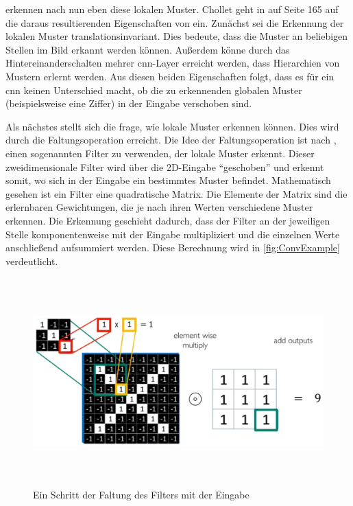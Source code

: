  erkennen nach \cite[S. 164]{DeepLearningPythonKeras} nun eben diese lokalen Muster.
Chollet geht in \cite{DeepLearningPythonKeras} auf Seite 165 auf die daraus resultierenden Eigenschaften von  ein.
Zunächst sei die Erkennung der lokalen Muster translationsinvariant.
Dies bedeute, dass die Muster an beliebigen Stellen im Bild erkannt werden können.
Außerdem könne durch das Hintereinanderschalten mehrer \acrshort{cnn}-Layer erreicht werden, dass Hierarchien von Mustern erlernt werden.
Aus diesen beiden Eigenschaften folgt, dass es für ein \acrshort{cnn} keinen Unterschied macht, ob die zu erkennenden globalen Muster (beispielsweise eine Ziffer) in der Eingabe verschoben sind.

Als nächstes stellt sich die frage, wie  lokale Muster erkennen können.
Dies wird durch die Faltungsoperation erreicht.
Die Idee der Faltungsoperation ist nach \cite{6S191CNN}, einen sogenannten Filter zu verwenden, der lokale Muster erkennt.
Dieser zweidimensionale Filter wird über die 2D-Eingabe "`geschoben"' und erkennt somit, wo sich in der Eingabe ein bestimmtes Muster befindet.
Mathematisch gesehen ist ein Filter eine quadratische Matrix.
Die Elemente der Matrix sind die erlernbaren Gewichtungen, die je nach ihren Werten verschiedene Muster erkennen.
Die Erkennung geschieht dadurch, dass der Filter an der jeweiligen Stelle komponentenweise mit der Eingabe multipliziert und die einzelnen Werte anschließend aufsummiert werden.
Diese Berechnung wird in \autoref{fig:ConvExample} verdeutlicht.

\begin{figure}[h]
    \centering
    \includegraphics[width=1.0\textwidth,height=8cm,keepaspectratio=true]{content/images/ConvExample.png}
    \caption{Ein Schritt der Faltung des Filters mit der Eingabe \cite{6S191CNN}}
    \label{fig:ConvExample}
\end{figure}

